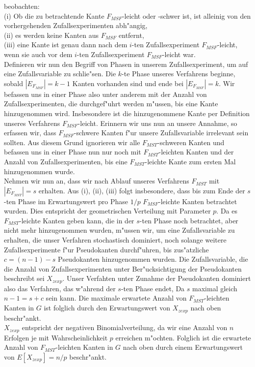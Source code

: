     beobachten:\\ 
(i) Ob die zu betrachtende Kante $F_{MSF}$-leicht oder -schwer ist, 
    ist alleinig von den vorhergehenden Zufallsexperimenten abh"angig,\\
(ii) es werden keine Kanten aus $F_{MSF}$ entfernt,\\
(iii) eine Kante ist genau dann nach dem $i$-ten Zufallsexperiment 
    $F_{MSF}$-leicht, wenn sie auch vor dem $i$-ten Zufallsexperiment $F_{MSF}$-leicht
    war.\\
Definieren wir nun den Begriff von Phasen in unserem Zufallsexperiment, um auf
    eine Zufallsvariable zu schlie"sen.
    Die $k$-te Phase unseres Verfahrens beginne, sobald $|E_{F_{MSF}}| = k-1$ Kanten
    vorhanden sind und ende bei $|E_{F_{MSF}}| = k$.
    Wir befassen uns in einer Phase also unter anderem mit der Anzahl von 
    Zufallsexperimenten, die durchgef"uhrt werden m"ussen, 
    bis eine Kante hinzugenommen wird.
    Insbesondere ist die hinzugenommene Kante per Definition unseres Verfahrens
    $F_{MSF}$-leicht. Erinnern wir uns nun an unsere Annahme, so erfassen wir,
    dass $F_{MSF}$-schwere Kanten f"ur unsere Zufallsvariable irrelevant sein
    sollten. Aus diesem Grund ignorieren wir alle $F_{MST}$-schweren Kanten und
    befassen uns in einer Phase nun nur noch mit $F_{MST}$-leichten Kanten und
    der Anzahl von Zufallsexperimenten, bis eine $F_{MST}$-leichte Kante zum 
    ersten Mal hinzugenommen wurde.\\
Nehmen wir nun an, dass wir nach Ablauf unseres Verfahrens $F_{MST}$ mit
    $|E_{F_{MST}}| = s$ erhalten. Aus (i), (ii), (iii) folgt insbesondere, dass bis zum Ende
    der $s$-ten Phase im Erwartungswert pro Phase $1/p$ $F_{MSF}$-leichte
    Kanten betrachtet wurden. Dies entspricht der geometrischen Verteilung mit
    Parameter $p$.
    Da es $F_{MST}$-leichte Kanten geben kann, die in der $s$-ten Phase noch
    betrachtet, aber nicht mehr hinzugenommen wurden,
    m"ussen wir, um eine Zufallsvariable zu 
    erhalten, die unser Verfahren stochastisch dominiert, noch solange weitere 
    Zufallsexperimente f"ur Pseudokanten durchf"uhren, bis zus"atzliche 
    $c=(n-1)-s$ Pseudokanten hinzugenommen wurden.
    Die Zufallsvariable, die die Anzahl von Zufallsexperimenten unter 
    Ber"ucksichtigung der Pseudokanten
    beschreibt sei
    $X_{zexp}$.
    Unser Verfahten unter Zunahme der Pseudokanten dominiert also das Verfahren,
    das w"ahrend der $s$-ten Phase endet,
    Da $s$ maximal gleich $n-1 = s+c$ sein kann.
    Die maximale erwartete Anzahl von $F_{MST}$-leichten Kanten in $G$ ist folglich durch den
    Erwartungswert von $X_{zexp}$ nach oben beschr"ankt.\\
$X_{zexp}$ entspricht der negativen Binomialverteilung, da wir eine Anzahl von
    $n$ Erfolgen je mit Wahrscheinlichkeit $p$ erreichen m"ochten. 
    Folglich ist die erwartete Anzahl von $F_{MST}$-leichten Kanten in $G$ 
    nach oben durch
    einem Erwartungswert von
    $E[X_{zexp}] = n/p$ beschr"ankt.\\
